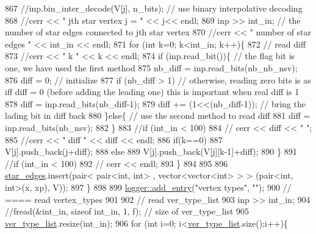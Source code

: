 \begin{DoxyCode}
867       \textcolor{comment}{//inp.bin\_inter\_decode(V[j], n\_bits); // use binary interpolative decoding}
868       \textcolor{comment}{//cerr << "  jth star vertex j = " << j<< endl; }
869       inp >> int\_in; \textcolor{comment}{// the number of star edges connected to jth star vertex}
870       \textcolor{comment}{//cerr << " number of star edges " << int\_in << endl;}
871       \textcolor{keywordflow}{for} (\textcolor{keywordtype}{int} k=0; k<int\_in; k++)\{
872         \textcolor{comment}{// read diff}
873         \textcolor{comment}{//cerr << " k " << k << endl;}
874         \textcolor{keywordflow}{if} (inp.read\_bit())\{ \textcolor{comment}{// the flag bit is one, we have used the first method }
875           nb\_diff = inp.read\_bits(nb\_nb\_nsv);
876           diff = 0; \textcolor{comment}{// initialize}
877           \textcolor{keywordflow}{if} (nb\_diff > 1) \textcolor{comment}{// otherwise, reading zero bits is as iff diff = 0 (before adding the leading
       one) this is important when real diff is 1}
878             diff = inp.read\_bits(nb\_diff-1);
879           diff += (1<<(nb\_diff-1)); \textcolor{comment}{// bring the lading bit in diff back }
880         \}\textcolor{keywordflow}{else}\{ \textcolor{comment}{// use the second method to read diff}
881           diff = inp.read\_bits(nb\_nsv);
882         \}
883         \textcolor{comment}{//if (int\_in < 100)}
884         \textcolor{comment}{//  cerr << diff << " ";}
885         \textcolor{comment}{//cerr << " diff " << diff << endl;}
886         \textcolor{keywordflow}{if}(k==0)
887           V[j].push\_back(j+diff);
888         \textcolor{keywordflow}{else}
889           V[j].push\_back(V[j][k-1]+diff);
890       \}
891       \textcolor{comment}{//if (int\_in < 100)}
892       \textcolor{comment}{//  cerr << endl;}
893     \}
894 
895 
896     \hyperlink{classmarked__graph__compressed_a7df5779d313486644132bd816937f532}{star\_edges}.insert(pair< pair<int, int> , vector<vector<int> > > (pair<int, int>(x, xp), V));
897   \}
898 
899   \hyperlink{classlogger_a710163deb17bc81f70d53d285b8ac9ac}{logger::add\_entry}(\textcolor{stringliteral}{"vertex types"}, \textcolor{stringliteral}{""});
900   \textcolor{comment}{// ==== read vertex\_types}
901 
902   \textcolor{comment}{// read ver\_type\_list}
903   inp >> int\_in;
904   \textcolor{comment}{//fread(&int\_in, sizeof int\_in, 1, f); // size of ver\_type\_list}
905   \hyperlink{classmarked__graph__compressed_af2e3e55223d436628a02758dfae88493}{ver\_type\_list}.resize(int\_in);
906   \textcolor{keywordflow}{for} (\textcolor{keywordtype}{int} i=0; i<\hyperlink{classmarked__graph__compressed_af2e3e55223d436628a02758dfae88493}{ver\_type\_list}.size();i++)\{

\end{DoxyCode}
